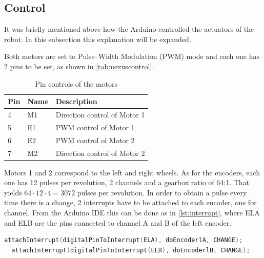 \subsection{Control}

It was briefly mentioned above how the Arduino controlled the actuators of the robot. In this subsection this explanation will be expanded.

Both motors are set to Pulse--Width Modulation (PWM) mode and each one has 2 pins to be set, as shown in \autoref{tab:nexuscontrol}. \
\begin{table}[htb]
  \centering
  \begin{tabular}{lll}
  \hline
  \textbf{Pin} & \textbf{Name} & \textbf{Description} \\ \hline
  4 & M1 & Direction control of Motor 1 \\ \hline
  5 & E1 & PWM control of Motor 1 \\ \hline
  6 & E2 & PWM control of Motor 2 \\ \hline
  7 & M2 & Direction control of Motor 2 \\ \hline
  \end{tabular}
  \caption{Pin controls of the motors}
  \label{tab:nexuscontrol}
\end{table}

Motors 1 and 2 correspond to the left and right wheels. As for the encoders, each one has 12 pulses per revolution, 2 channels and a gearbox ratio of 64:1. That yields $64\cdot 12\cdot 4 = 3072$ pulses per revolution. In order to obtain a pulse every time there is a change, 2 interrupts have to be attached to each encoder, one for channel. From the Arduino IDE this can be done as  in \autoref{lst:interrupt}, where ELA and ELB are the pins connected to channel A and B of the left encoder.
\begin{lstlisting}[float=htb,language=C,frame=htb,caption={Attaching interrupts},label=lst:interrupt] 
  attachInterrupt(digitalPinToInterrupt(ELA), doEncoderlA, CHANGE);
  attachInterrupt(digitalPinToInterrupt(ELB), doEncoderlB, CHANGE);
\end{lstlisting}


